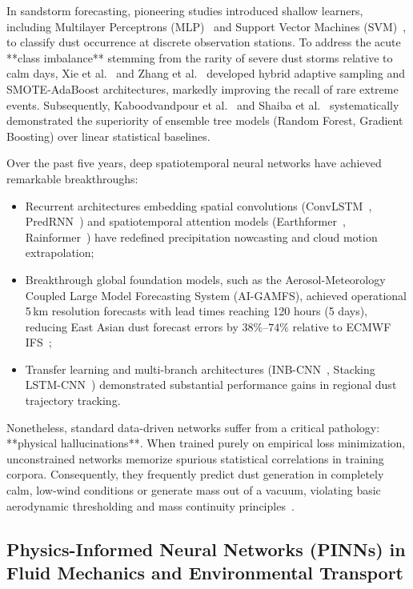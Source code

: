 In sandstorm forecasting, pioneering studies introduced shallow learners, including Multilayer Perceptrons (MLP)~\cite{ref3} and Support Vector Machines (SVM)~\cite{ref4}, to classify dust occurrence at discrete observation stations. To address the acute **class imbalance** stemming from the rarity of severe dust storms relative to calm days, Xie et al.~\cite{ref5} and Zhang et al.~\cite{ref6} developed hybrid adaptive sampling and SMOTE-AdaBoost architectures, markedly improving the recall of rare extreme events. Subsequently, Kaboodvandpour et al.~\cite{ref7} and Shaiba et al.~\cite{ref9} systematically demonstrated the superiority of ensemble tree models (Random Forest, Gradient Boosting) over linear statistical baselines.

Over the past five years, deep spatiotemporal neural networks have achieved remarkable breakthroughs:
\begin{itemize}
    \item Recurrent architectures embedding spatial convolutions (ConvLSTM~\cite{ref17}, PredRNN~\cite{ref18}) and spatiotemporal attention models (Earthformer~\cite{ref20}, Rainformer~\cite{ref19}) have redefined precipitation nowcasting and cloud motion extrapolation;
    \item Breakthrough global foundation models, such as the Aerosol-Meteorology Coupled Large Model Forecasting System (AI-GAMFS), achieved operational 5\,km resolution forecasts with lead times reaching 120 hours (5 days), reducing East Asian dust forecast errors by $38\%\text{--}74\%$ relative to ECMWF IFS~\cite{ref2};
    \item Transfer learning and multi-branch architectures (INB-CNN~\cite{ref10}, Stacking LSTM-CNN~\cite{ref16}) demonstrated substantial performance gains in regional dust trajectory tracking.
\end{itemize}

Nonetheless, standard data-driven networks suffer from a critical pathology: **physical hallucinations**. When trained purely on empirical loss minimization, unconstrained networks memorize spurious statistical correlations in training corpora. Consequently, they frequently predict dust generation in completely calm, low-wind conditions or generate mass out of a vacuum, violating basic aerodynamic thresholding and mass continuity principles~\cite{raissi2019physics}.

\subsection{Physics-Informed Neural Networks (PINNs) in Fluid Mechanics and Environmental Transport}
\label{subsec:pinn_progress}

